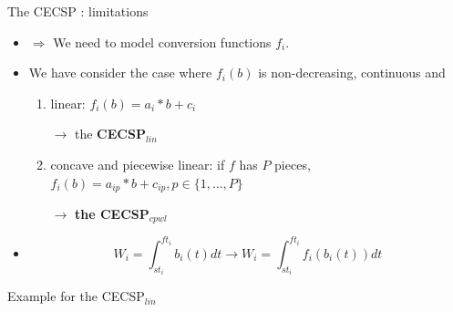  \begin{frame}{The CECSP : limitations}
   \begin{itemize}
   \item   $\Rightarrow$ We need to model conversion functions $f_i$.
     \vfill
   \item  We have consider the case where $f_i(b)$ is non-decreasing,
     continuous and  
     \begin{enumerate}
     \vspace{0.5cm}
     \item linear: $f_i(b)=a_i*b+c_i$ 

     \vspace{0.1cm}
       $\rightarrow$ the {\bf CECSP$_{lin}$}
     \vspace{0.5cm}
     \item concave and piecewise linear: if $f$ has $P$ pieces,
       $f_i(b)=a_{ip}*b+c_{ip}  , p \in \{1,\dots,P\}$

     \vspace{0.1cm}
       $\rightarrow$ {\bf the CECSP$_{cpwl}$} 
     \end{enumerate}
     \vfill
   \item   \[W_i=\int_{st_i}^{ft_i}b_i(t)dt \rightarrow W_i=\int_{st_i}^{ft_i}f_i(b_i(t))dt\]
   \end{itemize}
   \vfill
 \end{frame}
 
 \begin{frame}{Example for the CECSP$_{lin}$}
   
 \end{frame}

